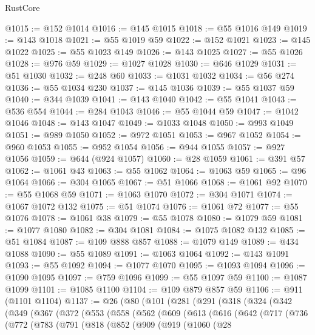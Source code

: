 \begin{lexlean}{RustCore}
\begin{coremodule}
@1015 := @152 @1014
@1016 := @145 @1015
@1018 := @55 @1016 @149
@1019 := @143 @1018
@1021 := @55 @1019 @59
@1022 := @152 @1021
@1023 := @145 @1022
@1025 := @55 @1023 @149
@1026 := @143 @1025
@1027 := @55 @1026
@1028 := @976 @59
@1029 := @1027 @1028
@1030 := @646 @1029
@1031 := @51 @1030
@1032 := @248 @60
@1033 := @1031 @1032
@1034 := @56 @274
@1036 := @55 @1034 @230
@1037 := @145 @1036
@1039 := @55 @1037 @59
@1040 := @344 @1039
@1041 := @143 @1040
@1042 := @55 @1041
@1043 := @536 @554
@1044 := @284 @1043
@1046 := @55 @1044 @59
@1047 := @1042 @1046
@1048 := @143 @1047
@1049 := @1033 @1048
@1050 := @993 @1049
@1051 := @989 @1050
@1052 := @972 @1051
@1053 := @967 @1052
@1054 := @960 @1053
@1055 := @952 @1054
@1056 := @944 @1055
@1057 := @927 @1056
@1059 := @644 (@924 @1057)
@1060 := @28 @1059
@1061 := @391 @57
@1062 := @1061 @43
@1063 := @55 @1062
@1064 := @1063 @59
@1065 := @96 @1064
@1066 := @304 @1065
@1067 := @51 @1066
@1068 := @1061 @92
@1070 := @55 @1068 @59
@1071 := @1063 @1070
@1072 := @304 @1071
@1074 := @1067 @1072 @132
@1075 := @51 @1074
@1076 := @1061 @72
@1077 := @55 @1076
@1078 := @1061 @38
@1079 := @55 @1078
@1080 := @1079 @59
@1081 := @1077 @1080
@1082 := @304 @1081
@1084 := @1075 @1082 @132
@1085 := @51 @1084
@1087 := @109 @888 @857
@1088 := @1079 @149
@1089 := @434 @1088
@1090 := @55 @1089
@1091 := @1063 @1064
@1092 := @143 @1091
@1093 := @55 @1092
@1094 := @1077 @1070
@1095 := @1093 @1094
@1096 := @1090 @1095
@1097 := @759 @1096
@1099 := @55 @1097 @59
@1100 := @1087 @1099
@1101 := @1085 @1100
@1104 := @109 @879 @857 @59
@1106 := @911 (@1101 @1104)
@1137 := @26
    (@80
      (@101
        (@281
          (@291
            (@318
              (@324
                (@342
                  (@349
                    (@367
                      (@372
                        (@553
                          (@558
                            (@562
                              (@609
                                (@613
                                  (@616
                                    (@642
                                      (@717
                                        (@736
                                          (@772
                                            (@783
                                              (@791
                                                (@818
                                                  (@852
                                                    (@909
                                                      (@919
                                                        (@1060
                                                          (@28

\end{coremodule}
\end{lexlean}
